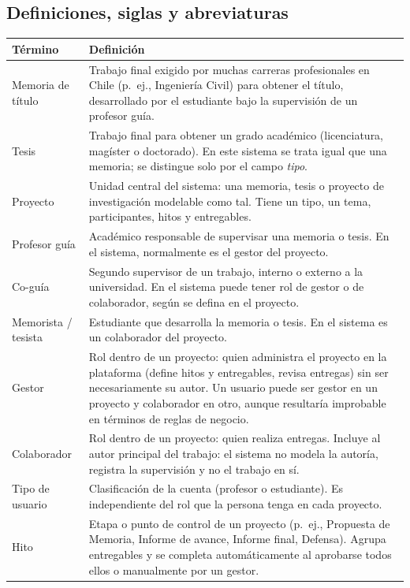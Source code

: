 \documentclass[10pt,a4paper]{article}
\newcommand{\hrow}{\rowcolor{encabezado}}
\newcommand{\h}[1]{\textbf{#1}}
\begin{document}
\subsection{Definiciones, siglas y abreviaturas}
\begin{xltabular}{\linewidth}{|P{4.6cm}|L|}
\hline\hrow \h{Término} & \h{Definición} \\ \hline
\endhead
Memoria de título & Trabajo final exigido por muchas carreras profesionales en Chile (p.~ej., Ingeniería Civil) para obtener el título, desarrollado por el estudiante bajo la supervisión de un profesor guía. \\ \hline
Tesis & Trabajo final para obtener un grado académico (licenciatura, magíster o doctorado). En este sistema se trata igual que una memoria; se distingue solo por el campo \emph{tipo}. \\ \hline
Proyecto & Unidad central del sistema: una memoria, tesis o proyecto de investigación modelable como tal. Tiene un tipo, un tema, participantes, hitos y entregables. \\ \hline
Profesor guía & Académico responsable de supervisar una memoria o tesis. En el sistema, normalmente es el gestor del proyecto. \\ \hline
Co-guía & Segundo supervisor de un trabajo, interno o externo a la universidad. En el sistema puede tener rol de gestor o de colaborador, según se defina en el proyecto. \\ \hline
Memorista / tesista & Estudiante que desarrolla la memoria o tesis. En el sistema es un colaborador del proyecto. \\ \hline
Gestor & Rol dentro de un proyecto: quien administra el proyecto en la plataforma (define hitos y entregables, revisa entregas) sin ser necesariamente su autor. Un usuario puede ser gestor en un proyecto y colaborador en otro, aunque resultaría improbable en términos de reglas de negocio. \\ \hline
Colaborador & Rol dentro de un proyecto: quien realiza entregas. Incluye al autor principal del trabajo: el sistema no modela la autoría, registra la supervisión y no el trabajo en sí. \\ \hline
Tipo de usuario & Clasificación de la cuenta (profesor o estudiante). Es independiente del rol que la persona tenga en cada proyecto. \\ \hline
Hito & Etapa o punto de control de un proyecto (p.~ej., Propuesta de Memoria, Informe de avance, Informe final, Defensa). Agrupa entregables y se completa automáticamente al aprobarse todos ellos o manualmente por un gestor. \\ \hline

\end{xltabular}
\end{document}
